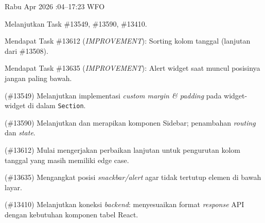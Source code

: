 \begin{logtable}
    {
        Rabu  Apr 2026 :04--17:23 \linebreak %
        WFO
    }{
        \begin{loglist}
            \item Melanjutkan Task \#13549, \#13590, \#13410.
            \item Mendapat Task \#13612 (\textit{IMPROVEMENT}): Sorting kolom tanggal (lanjutan
            dari \#13508).
            \item Mendapat Task \#13635 (\textit{IMPROVEMENT}): Alert widget saat muncul
            posisinya jangan paling bawah.
        \end{loglist}
    }{
        \begin{logwork}
            \item (\#13549) Melanjutkan implementasi \textit{custom margin \& padding} pada widget-widget di dalam \texttt{Section}.
            \item (\#13590) Melanjutkan dan merapikan komponen Sidebar; penambahan \textit{routing} dan \textit{state}.
            \item (\#13612) Mulai mengerjakan perbaikan lanjutan untuk pengurutan kolom tanggal yang masih memiliki edge case.
            \item (\#13635) Mengangkat posisi \textit{snackbar/alert} agar tidak tertutup elemen di bawah layar.
            \item (\#13410) Melanjutkan koneksi \textit{backend}: menyesuaikan format \textit{response} API dengan kebutuhan komponen tabel React.
        \end{logwork}
    }


\end{logtable}
